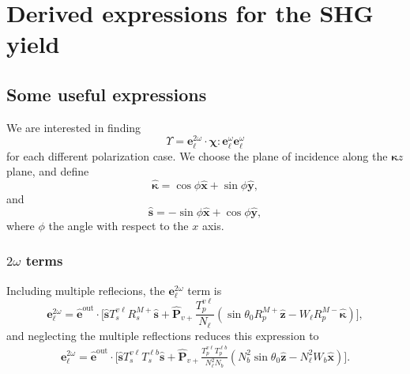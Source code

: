 \chapter{Derived expressions for the SHG yield}


\section{Some useful expressions}
We are interested in finding
\begin{equation*}
\Upsilon = 
\mathbf{e}^{2\omega}_{\ell}\cdot\boldsymbol{\chi}:
\mathbf{e}^{\omega}_{\ell}\mathbf{e}^{\omega}_{\ell}
\end{equation*}
for each different polarization case. We choose the plane of incidence
along the $\boldsymbol{\kappa}z$ plane, and define 
\begin{equation}\label{eq:kappavec}
\hat{\boldsymbol{\kappa}}
= \cos\phi\hat{\mathbf{x}} + \sin\phi\hat{\mathbf{y}},
\end{equation}
and
\begin{equation}\label{eq:svec}
\hat{\mathbf{s}} = -\sin\phi\hat{\mathbf{x}} + \cos\phi\hat{\mathbf{y}},
\end{equation}
where $\phi$ the angle with respect to the $x$ axis.


\subsection{\texorpdfstring{$2\omega$}{2w} terms}

Including multiple reflecions, the $\mathbf{e}^{2\omega}_{\ell}$ term is
\begin{equation}\label{eq:e2wellmr}
\mathbf{e}^{2\omega}_{\ell} = \hat{\mathbf{e}}^{\mathrm{out}}\cdot
\Bigg[
\hat{\mathbf{s}}T_{s}^{v\ell}R^{M+}_{s}\hat{\mathbf{s}} + 
\hat{\mathbf{P}}_{v+}\frac{T^{v\ell}_{p}}{N_{\ell}}
\left(
\sin\theta_{0}R^{M+}_{p}\hat{\mathbf{z}} 
- W_{\ell}R^{M-}_{p}\hat{\boldsymbol{\kappa}}
\right)
\Bigg],
\end{equation}
and neglecting the multiple reflections reduces this expression to
\begin{equation}\label{eq:e2well}
\begin{split}
\mathbf{e}^{2\omega}_{\ell} = 
\hat{\mathbf{e}}^{\mathrm{out}}\cdot
\Bigg[
\hat{\mathbf{s}}T_{s}^{v\ell}T_{s}^{\ell b}\hat{\mathbf{s}} + 
\hat{\mathbf{P}}_{v+}
\frac{T^{v\ell}_{p}T^{\ell b}_{p}}
     {N^{2}_{\ell}N_{b}}
\left(
N^{2}_{b}\sin\theta_{0}\hat{\mathbf{z}} - N^{2}_{\ell}W_{b}\hat{\mathbf{x}}
\right)
\Bigg].
\end{split}
\end{equation}  


